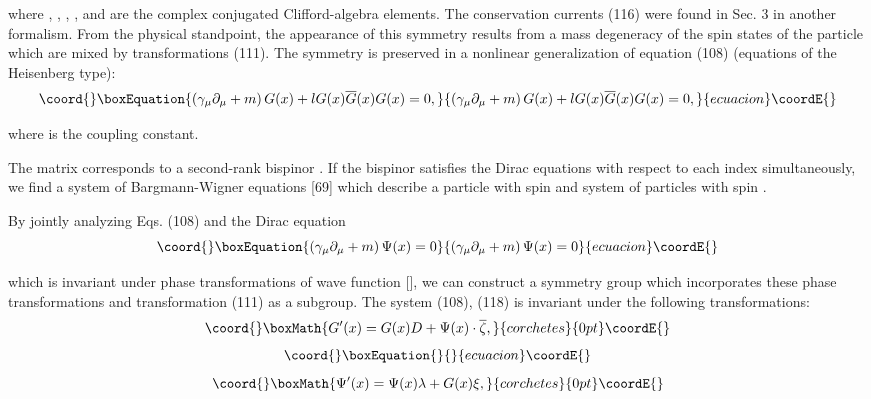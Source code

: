 \documentclass[a4paper,12pt]{article}
\begin{document}
where \coordHE{}  \coordHE{}, \myHighlight{$\gamma _\mu $}\coordHE{}, \coordHE{}, \coordHE{}, \coordHE{} and
\coordHE{} are the complex conjugated Clifford-algebra
elements. The conservation currents (116) were found in Sec. 3 in
another formalism. From the physical standpoint, the appearance of
this symmetry results from a mass degeneracy of the spin states of
the particle which are mixed by transformations (111). The
symmetry is preserved in a nonlinear generalization of equation
(108) (equations of the Heisenberg type):
\begin{equation}\coord{}\boxEquation{
\left( \gamma _\mu \partial _\mu +m\right)
G(x)+lG(x)\overline{G}(x)G(x)=0  ,\label{117}
}{
\left( \gamma _\mu \partial _\mu +m\right)
G(x)+lG(x)\overline{G}(x)G(x)=0  ,}{ecuacion}\coordE{}\end{equation}

where \coordHE{} is the coupling constant.

The matrix \coordHE{} corresponds to a second-rank bispinor \coordHE{}. If the bispinor satisfies the Dirac equations with
respect to each index simultaneously, we find a system of
Bargmann-Wigner equations [69] which describe a particle with spin
\coordHE{} and system of particles with spin \coordHE{}.

By jointly analyzing Eqs. (108) and the Dirac equation
\begin{equation}\coord{}\boxEquation{
\left( \gamma _\mu \partial _\mu +m\right) \Psi (x)=0  \label{118}
}{
\left( \gamma _\mu \partial _\mu +m\right) \Psi (x)=0  }{ecuacion}\coordE{}\end{equation}

which is invariant under phase transformations of wave function
\coordHE{} [\coordHE{}], we can construct a symmetry group which incorporates
these phase transformations and transformation (111) as a
subgroup. The system (108), (118) is invariant under the following
transformations:
\[\coord{}\boxMath{
G^{\prime }(x)=G(x)D+\Psi (x)\cdot \overline{\zeta } ,
}{corchetes}{0pt}\coordE{}\]
\vspace{-8mm}
\begin{equation}\coord{}\boxEquation{  \label{119}
}{  }{ecuacion}\coordE{}\end{equation}
\vspace{-8mm}
\[\coord{}\boxMath{
\Psi ^{\prime }(x)=\Psi (x)\lambda +G(x)\xi ,
}{corchetes}{0pt}\coordE{}\]
\end{document}
